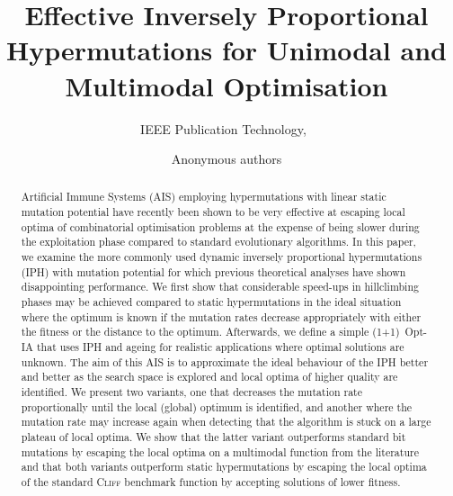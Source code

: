 \documentclass[lettersize,journal]{IEEEtran}
\begin{document}
\title{Effective Inversely Proportional Hypermutations for Unimodal and Multimodal Optimisation}

\author{IEEE Publication Technology,~	

}
\author{Anonymous authors	

}



\maketitle

\begin{abstract}

Artificial Immune Systems (AIS) employing hypermutations with linear static mutation potential have recently been shown to be very effective at escaping local optima of combinatorial optimisation problems at the expense of being slower during the exploitation phase compared to standard evolutionary algorithms.
In this paper, we examine the more commonly used dynamic inversely proportional  hypermutations (IPH) with mutation potential for which previous theoretical analyses have shown disappointing performance. We first show that considerable speed-ups
in hillclimbing phases may be achieved compared to static hypermutations in the ideal situation where the optimum is known if the mutation rates decrease appropriately with either the fitness or the distance to the optimum. Afterwards, we define a simple (1+1)~Opt-IA that uses IPH and ageing for realistic applications where optimal solutions are unknown. The aim of this AIS is to approximate the ideal behaviour of the IPH better and better as the search space is explored and local optima of higher quality are identified.
We present two variants, one that decreases the mutation rate proportionally until the local (global) optimum is identified, and another where the mutation rate may increase again when detecting that the algorithm is stuck on a large plateau of local optima.
We show that the latter variant outperforms standard bit mutations by escaping the local optima on a multimodal function from the literature and that both variants outperform static hypermutations by escaping the local optima of the standard \textsc{Cliff} benchmark function by accepting solutions of lower fitness.  
\end{abstract}
\end{document}
